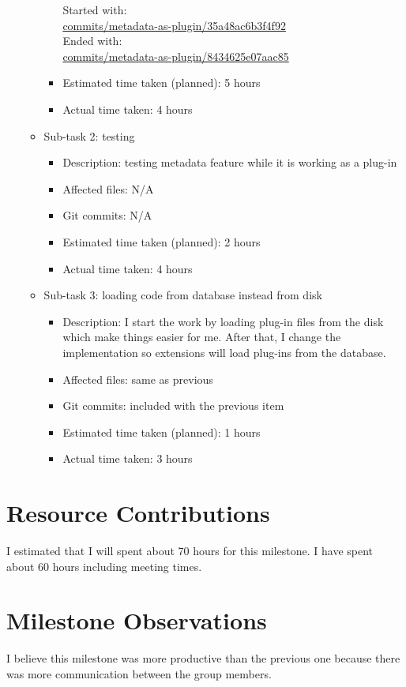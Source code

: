 \documentclass{article}
\begin{document}
\begin{itemize}
\begin{itemize}
\begin{itemize}
Started with:\\
\href{http://github.com/mfbDev/earth/commits/metadata_as_plugin/35a48ac6b3f4f92}{commits/metadata-as-plugin/35a48ac6b3f4f92}\\
Ended with:\\
\href{http://github.com/mfbDev/earth/commits/metadata_as_plugin/8434625e07aac85}{commits/metadata-as-plugin/8434625e07aac85}\\
					\item Estimated time taken (planned): 5 hours
					\item Actual time taken: 4 hours
				\end{itemize}
			\item Sub-task 2: testing
				\begin{itemize}
					\item Description: testing metadata feature while it is working as a plug-in
					\item Affected files: N/A
					\item Git commits: N/A
					\item Estimated time taken (planned): 2 hours
					\item Actual time taken: 4 hours
				\end{itemize}
			\item Sub-task 3: loading code from database instead from disk
				\begin{itemize}
					\item Description: I start the work by loading plug-in files from the disk which make things easier for me. After that, I change the implementation so extensions will load plug-ins from the database.
					\item Affected files: same as previous
					\item Git commits: included with the previous item
					\item Estimated time taken (planned): 1 hours
					\item Actual time taken: 3 hours
				\end{itemize}
		\end{itemize}
\end{itemize}

\section*{Resource Contributions}
I estimated that I will spent about 70 hours for this milestone. I have spent about 60 hours including meeting times. 


\section*{Milestone Observations}
I believe this milestone was more productive than the previous one because there was more communication between the group members.\\
\end{document}
